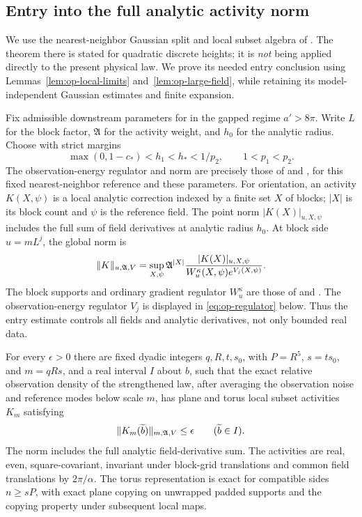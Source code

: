 \subsection{Entry into the full analytic activity norm}

We use the nearest-neighbor Gaussian split and local subset
algebra of .  The theorem there is stated for
quadratic discrete heights; it is \emph{not} being applied
directly to the present physical law.  We prove its needed
entry conclusion using Lemmas~\ref{lem:op-local-limits}
and~\ref{lem:op-large-field}, while retaining its
model-independent Gaussian estimates and finite expansion.

Fix admissible downstream parameters for  in
the gapped regime \(a'>8\pi\).  Write \(L\) for the block
factor, \(\mathfrak A\) for the activity weight, and \(h_0\)
for the analytic radius.  Choose with strict margins
\begin{equation}\label{eq:op-reserve}
 \max(0,1-c_*)<h_1<h_*<1/p_2,\qquad 1<p_1<p_2.
\end{equation}
The observation-energy regulator and norm are precisely those
of  and , for this fixed
nearest-neighbor reference and these parameters.
For orientation, an activity \(K(X,\psi)\) is a local analytic
correction indexed by a finite set \(X\) of blocks; \(|X|\) is
its block count and \(\psi\) is the reference field.
The point norm \(|K(X)|_{u,X,\psi}\) includes the full sum of
field derivatives at analytic radius \(h_0\). At block side
\(u=mL^j\), the global norm is
\[
 \lVert K\rVert_{u,\mathfrak A,V}
 =\sup_{X,\psi}\mathfrak A^{|X|}
   \frac{|K(X)|_{u,X,\psi}}
        {W_u^\kappa(X,\psi)e^{V_j(X,\psi)}}.
\]
The block supports and ordinary gradient regulator \(W_u^\kappa\)
are those of  and .
The observation-energy regulator \(V_j\) is displayed in
\eqref{eq:op-regulator} below. Thus the entry estimate controls
all fields and analytic derivatives, not only bounded real data.

\begin{lemma}\label{lem:op-entry}
For every \(\epsilon>0\) there are fixed dyadic integers
\(q,R,t,s_0\), with \(P=R^5\), \(s=ts_0\), and \(m=qRs\),
and a real interval \(I\) about \(b\), such that the exact
relative observation density of the strengthened law, after
averaging the observation noise and reference modes below
scale \(m\), has plane and torus local subset activities
\(K_m\) satisfying
\begin{equation}\label{eq:op-entry-small}
       \lVert K_m(\widetilde b)\rVert_{m,\mathfrak A,V}
                       \leq\epsilon\qquad(\widetilde b\in I).
\end{equation}
The norm includes the full analytic field-derivative sum.
The activities are real, even, square-covariant, invariant
under block-grid translations and common field translations
by \(2\pi/\alpha\).  The torus representation is exact for
compatible sides \(n\geq sP\), with exact plane copying on
unwrapped padded supports and the copying property under
subsequent local maps.
\end{lemma}


